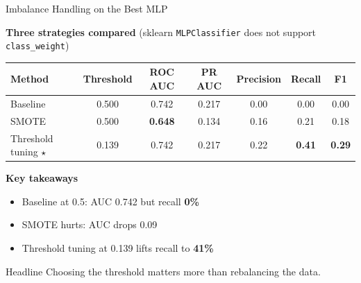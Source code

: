 \documentclass[aspectratio=169,11pt]{beamer}
\newcommand{\hi}[1]{{\color{accent}\textbf{#1}}}
\newcommand{\hp}[1]{{\color{primary}\textbf{#1}}}
\begin{document}
\begin{frame}{Imbalance Handling on the Best MLP}

\scriptsize

\textbf{Three strategies compared} (sklearn \texttt{MLPClassifier} does not support \texttt{class\_weight})

\begin{tabular}{@{}lcccccc@{}}
    \toprule
    \hp{Method}              & \hp{Threshold} & \hp{ROC AUC} & \hp{PR AUC} & \hp{Precision} & \hp{Recall} & \hp{F1} \\
    \midrule
    Baseline                 & 0.500 & 0.742 & 0.217 & 0.00 & 0.00 & 0.00 \\
    SMOTE                    & 0.500 & {\color{warn}\textbf{0.648}} & 0.134 & 0.16 & 0.21 & 0.18 \\
    Threshold tuning $\star$ & 0.139 & 0.742 & 0.217 & 0.22 & \hi{\textbf{0.41}} & \textbf{0.29} \\
    \bottomrule
\end{tabular}

\vspace{0.2cm}

\textbf{Key takeaways}
\begin{itemize}
    \item Baseline at 0.5: AUC 0.742 but recall \hi{0\%}
    \item SMOTE hurts: AUC drops 0.09
    \item Threshold tuning at 0.139 lifts recall to \hi{41\%}
\end{itemize}

\vspace{0.1cm}

\begin{block}{Headline}
Choosing the threshold matters more than rebalancing the data.
\end{block}

\end{frame}
\end{document}
